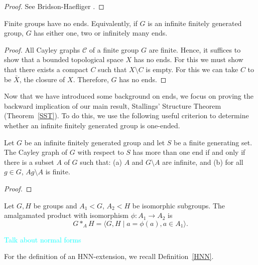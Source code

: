 \begin{proof}
    See Bridson-Haefliger \cite[p.~146--147]{bridson_haefliger_metric_1999}.
\end{proof}

\begin{corollary}
    Finite groups have no ends. Equivalently, if \(G\) is an infinite finitely generated group, \(G\) has either one, two or infinitely many ends.
\end{corollary}

\begin{proof} %
    All Cayley graphs \(\mathcal{C}\) of a finite group \(G\) are finite. Hence, it suffices to show that a bounded topological space \(X\) has no ends. For this we must show that there exists a compact \(C\) such that \(X \setminus C\) is empty. For this we can take \(C\) to be \(\bar{X}\), the closure of \(X\). Therefore, \(G\) has no ends.
\end{proof}

Now that we have introduced some background on ends, we focus on proving the backward implication of our main result, Stallings' Structure Theorem (Theorem~\ref{SST}). To do this, we use the following useful criterion to determine whether an infinite finitely generated group is one-ended.
\begin{proposition} 
Let \(G\) be an infinite finitely generated group and let \(S\) be a  finite generating set.
The Cayley graph of \(G\) with respect to \(S\) has more than one end if and only if there is a subset \(A\) of \(G\) such that:
    (a) \(A\) and \(G \setminus A\) are infinite, and
    (b) for all \(g \in G\), \(Ag \setminus A\) is finite.
\end{proposition}

\begin{proof}

\end{proof}


 \begin{definition}
     Let \(G,H\) be groups and \(A_1 < G\), \(A_2 < H\) be isomorphic subgroups. The amalgamated product with isomorphism \(\phi: A_1 \to A_2\) is 
     \[
     G *_A H = \langle G,H \mid a = \phi(a), a \in A_1 \rangle .
     \]
 \end{definition}

 \textcolor{cyan}{Talk about normal forms}

For the definition of an HNN-extension, we recall Definition~\ref{HNN}.

